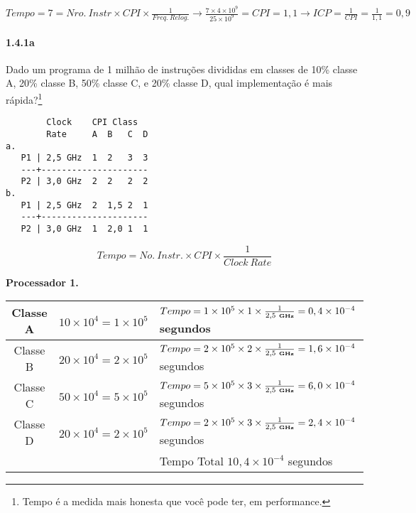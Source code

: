 \documentclass{article}
\begin{document}
$Tempo = 7 = {Nro.\ Instr}\times{CPI}\times\frac{1}{Freq.\ Relog.} \rightarrow 
\frac{7 \times 4 \times 10^{9}}{25 \times 10^{9}} = CPI = 1,1 \rightarrow ICP = 
\frac{1}{CPI} = \frac{1}{1,1} = 0,9$

\clearpage
\paragraph{1.4.1a} Dado um programa de 1 milhão de instruções divididas em 
classes de 10\% classe A, 20\% classe B, 50\% classe C, e 20\% classe D, qual 
implementação é mais rápida?\footnote{Tempo é a medida mais honesta que você 
pode ter, em performance.}

\begin{verbatim}
        Clock    CPI Class
        Rate     A  B   C  D
a.
   P1 | 2,5 GHz  1  2   3  3
   ---+---------------------
   P2 | 3,0 GHz  2  2   2  2
b.
   P1 | 2,5 GHz  2  1,5 2  1
   ---+---------------------
   P2 | 3,0 GHz  1  2,0 1  1
\end{verbatim}

$$Tempo = No.\ Instr. \times CPI \times \frac{1}{Clock\ Rate}$$

\textbf{Processador 1.}

\begin{tabular}{|c|l|l|}
\hline Classe A & $10 \times 10^{4} = 1 \times 10^{5}$ &

$Tempo = 1 \times 10^{5} \times 1 \times \frac{1}{2,5\ \textbf{\tiny GHz}} = 
0,4 \times 10^{-4}$ segundos \\

\hline Classe B & $20 \times 10^{4} = 2 \times 10^{5}$ &

$Tempo = 2 \times 10^{5} \times 2 \times \frac{1}{2,5\ \textbf{\tiny GHz}} = 
1,6 \times 10^{-4}$ segundos \\

\hline Classe C & $50 \times 10^{4} = 5 \times 10^{5}$ &

$Tempo = 5 \times 10^{5} \times 3 \times \frac{1}{2,5\ \textbf{\tiny GHz}} = 
6,0 \times 10^{-4}$ segundos \\

\hline Classe D & $20 \times 10^{4} = 2 \times 10^{5}$ &

$Tempo = 2 \times 10^{5} \times 3 \times \frac{1}{2,5\ \textbf{\tiny GHz}} = 
2,4 \times 10^{-4}$ segundos \\

\hline & & Tempo Total $10,4 \times 10^{-4}$ segundos \\

\hline
\end{tabular}
\end{document}
